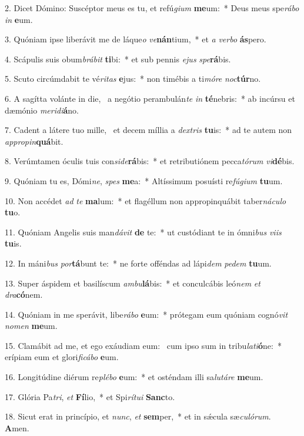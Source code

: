 2. Dicet Dómino: Suscéptor meus es tu, et refú\textit{gi}\textit{um} \textbf{me}um:~*  Deus meus spe\textit{rá}\textit{bo} \textit{in} \textbf{e}um.\

3. Quóniam ipse liberávit me de láque\textit{o} \textit{ve}\textbf{nán}tium,~*  et \textit{a} \textit{ver}\textit{bo} \textbf{ás}pero.\

4. Scápulis suis obum\textit{brá}\textit{bit} \textbf{ti}bi:~*  et sub pennis \textit{e}\textit{jus} \textit{spe}\textbf{rá}bis.\

5. Scuto circúmdabit te vé\textit{ri}\textit{tas} \textbf{e}jus:~*  non timébis a ti\textit{mó}\textit{re} \textit{noc}\textbf{túr}no.\

6. A sagítta volánte in die, \dag\  a negótio perambulán\textit{te} \textit{in} \textbf{té}nebris:~*  ab incúrsu et dæmónio \textit{me}\textit{ri}\textit{di}\textbf{á}no.\

7. Cadent a látere tuo mille, \dag\  et decem míllia a \textit{dex}\textit{tris} \textbf{tu}is:~*  ad te autem non \textit{ap}\textit{pro}\textit{pin}\textbf{quá}bit.\

8. Verúmtamen óculis tuis con\textit{si}\textit{de}\textbf{rá}bis:~*  et retributiónem pecca\textit{tó}\textit{rum} \textit{vi}\textbf{dé}bis.\

9. Quóniam tu es, Dómi\textit{ne}, \textit{spes} \textbf{me}a:~*  Altíssimum posuísti re\textit{fú}\textit{gi}\textit{um} \textbf{tu}um.\

10. Non accédet \textit{ad} \textit{te} \textbf{ma}lum:~*  et flagéllum non appropinquábit taber\textit{ná}\textit{cu}\textit{lo} \textbf{tu}o.\

11. Quóniam Angelis suis man\textit{dá}\textit{vit} \textbf{de} te:~*  ut custódiant te in ómni\textit{bus} \textit{vi}\textit{is} \textbf{tu}is.\

12. In máni\textit{bus} \textit{por}\textbf{tá}bunt te:~*  ne forte offéndas ad lápi\textit{dem} \textit{pe}\textit{dem} \textbf{tu}um.\

13. Super áspidem et basilíscum \textit{am}\textit{bu}\textbf{lá}bis:~*  et conculcábis leó\textit{nem} \textit{et} \textit{dra}\textbf{có}nem.\

14. Quóniam in me sperávit, libe\textit{rá}\textit{bo} \textbf{e}um:~*  prótegam eum quóniam cognó\textit{vit} \textit{no}\textit{men} \textbf{me}um.\

15. Clamábit ad me, et ego exáudiam eum: \dag\  cum ipso sum in tribu\textit{la}\textit{ti}\textbf{ó}ne:~*  erípiam eum et glori\textit{fi}\textit{cá}\textit{bo} \textbf{e}um.\

16. Longitúdine diérum re\textit{plé}\textit{bo} \textbf{e}um:~*  et osténdam illi sa\textit{lu}\textit{tá}\textit{re} \textbf{me}um.\

17. Glória Pa\textit{tri}, \textit{et} \textbf{Fí}lio,~*  et Spi\textit{rí}\textit{tu}\textit{i} \textbf{Sanc}to.\

18. Sicut erat in princípio, et \textit{nunc}, \textit{et} \textbf{sem}per,~*  et in sǽcula sæ\textit{cu}\textit{ló}\textit{rum}. \textbf{A}men.\

